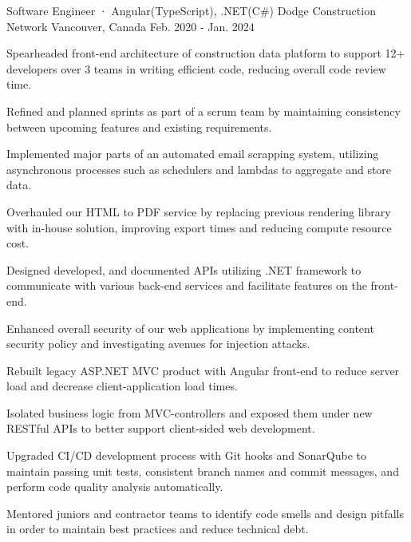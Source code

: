 

\begin{cventries}

\cventry
  {Software Engineer · Angular(TypeScript), .NET(C\#)} %
  {Dodge Construction Network} %
  {Vancouver, Canada} %
  {Feb. 2020 - Jan. 2024} %
  {
    \begin{cvitems} %
      \item {Spearheaded front-end architecture of construction data platform to support 12+ developers over 3 teams in writing efficient code, reducing overall code review time.}
      \item {Refined and planned sprints as part of a scrum team by maintaining consistency between upcoming features and existing requirements.}
      \item {Implemented major parts of an automated email scrapping system, utilizing asynchronous processes such as schedulers and lambdas to aggregate and store data.}
      \item {Overhauled our HTML to PDF service by replacing previous rendering library with in-house solution, improving export times and reducing compute resource cost.}
      \item {Designed developed, and documented APIs utilizing .NET framework to communicate with various back-end services and facilitate features on the front-end.}
      \item {Enhanced overall security of our web applications by implementing content security policy and investigating avenues for injection attacks.}
      \item {Rebuilt legacy ASP.NET MVC product with Angular front-end to reduce server load and decrease client-application load times.}
      \item {Isolated business logic from MVC-controllers and exposed them under new RESTful APIs to better support client-sided web development.}
      \item {Upgraded CI/CD development process with Git hooks and SonarQube to maintain passing unit tests, consistent branch names and commit messages, and perform code quality analysis automatically.}
      \item {Mentored juniors and contractor teams to identify code smells and design pitfalls in order to maintain best practices and reduce technical debt.}
    \end{cvitems}
  }


\end{cventries}
